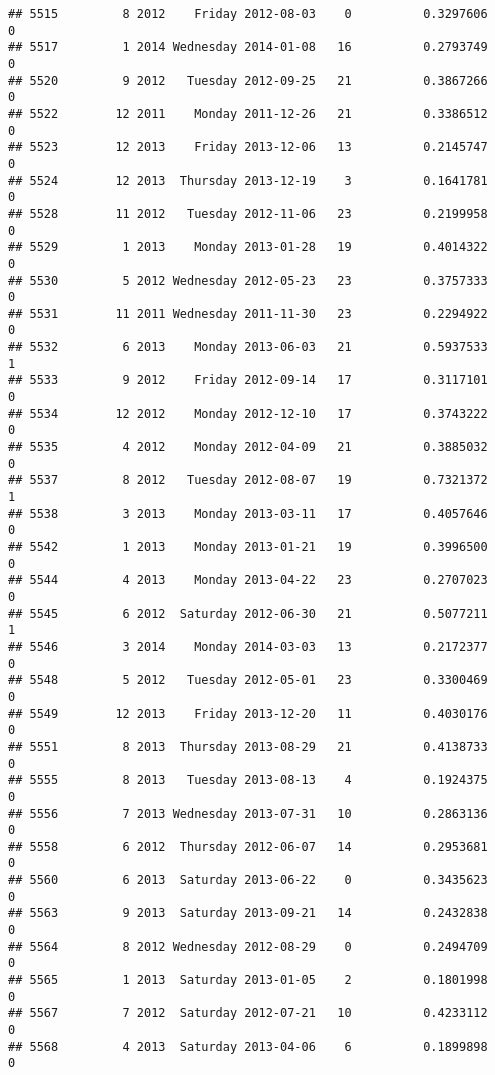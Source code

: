\documentclass[
]{article}
\begin{document}
\begin{verbatim}
## 5515         8 2012    Friday 2012-08-03    0          0.3297606             0
## 5517         1 2014 Wednesday 2014-01-08   16          0.2793749             0
## 5520         9 2012   Tuesday 2012-09-25   21          0.3867266             0
## 5522        12 2011    Monday 2011-12-26   21          0.3386512             0
## 5523        12 2013    Friday 2013-12-06   13          0.2145747             0
## 5524        12 2013  Thursday 2013-12-19    3          0.1641781             0
## 5528        11 2012   Tuesday 2012-11-06   23          0.2199958             0
## 5529         1 2013    Monday 2013-01-28   19          0.4014322             0
## 5530         5 2012 Wednesday 2012-05-23   23          0.3757333             0
## 5531        11 2011 Wednesday 2011-11-30   23          0.2294922             0
## 5532         6 2013    Monday 2013-06-03   21          0.5937533             1
## 5533         9 2012    Friday 2012-09-14   17          0.3117101             0
## 5534        12 2012    Monday 2012-12-10   17          0.3743222             0
## 5535         4 2012    Monday 2012-04-09   21          0.3885032             0
## 5537         8 2012   Tuesday 2012-08-07   19          0.7321372             1
## 5538         3 2013    Monday 2013-03-11   17          0.4057646             0
## 5542         1 2013    Monday 2013-01-21   19          0.3996500             0
## 5544         4 2013    Monday 2013-04-22   23          0.2707023             0
## 5545         6 2012  Saturday 2012-06-30   21          0.5077211             1
## 5546         3 2014    Monday 2014-03-03   13          0.2172377             0
## 5548         5 2012   Tuesday 2012-05-01   23          0.3300469             0
## 5549        12 2013    Friday 2013-12-20   11          0.4030176             0
## 5551         8 2013  Thursday 2013-08-29   21          0.4138733             0
## 5555         8 2013   Tuesday 2013-08-13    4          0.1924375             0
## 5556         7 2013 Wednesday 2013-07-31   10          0.2863136             0
## 5558         6 2012  Thursday 2012-06-07   14          0.2953681             0
## 5560         6 2013  Saturday 2013-06-22    0          0.3435623             0
## 5563         9 2013  Saturday 2013-09-21   14          0.2432838             0
## 5564         8 2012 Wednesday 2012-08-29    0          0.2494709             0
## 5565         1 2013  Saturday 2013-01-05    2          0.1801998             0
## 5567         7 2012  Saturday 2012-07-21   10          0.4233112             0
## 5568         4 2013  Saturday 2013-04-06    6          0.1899898             0

\end{verbatim}
\end{document}
